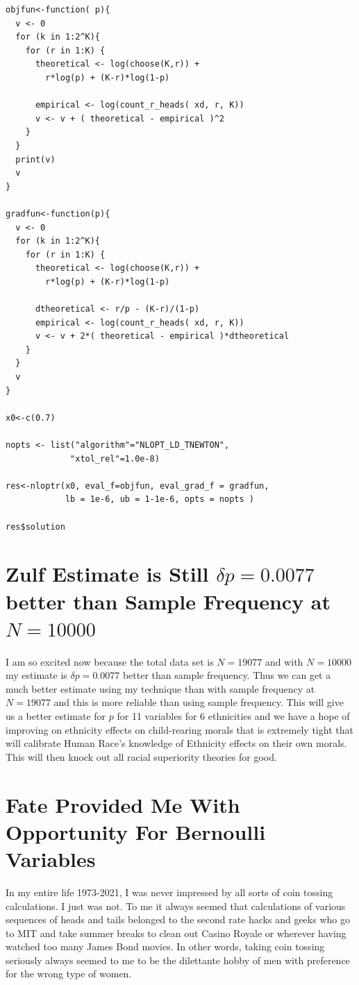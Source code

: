 \documentclass{amsart}
\begin{document}
\begin{verbatim}
objfun<-function( p){
  v <- 0
  for (k in 1:2^K){
    for (r in 1:K) {
      theoretical <- log(choose(K,r)) + 
        r*log(p) + (K-r)*log(1-p)
      
      empirical <- log(count_r_heads( xd, r, K))
      v <- v + ( theoretical - empirical )^2
    }
  }
  print(v)
  v
}

gradfun<-function(p){
  v <- 0
  for (k in 1:2^K){
    for (r in 1:K) {
      theoretical <- log(choose(K,r)) + 
        r*log(p) + (K-r)*log(1-p)
      
      dtheoretical <- r/p - (K-r)/(1-p)
      empirical <- log(count_r_heads( xd, r, K))
      v <- v + 2*( theoretical - empirical )*dtheoretical
    }
  }
  v
}

x0<-c(0.7)

nopts <- list("algorithm"="NLOPT_LD_TNEWTON",
             "xtol_rel"=1.0e-8)

res<-nloptr(x0, eval_f=objfun, eval_grad_f = gradfun, 
            lb = 1e-6, ub = 1-1e-6, opts = nopts )

res$solution
\end{verbatim}


\section{Zulf Estimate is Still $\delta p = 0.0077$ better than Sample Frequency at $N=10000$}

I am so excited now because the total data set is $N=19077$ and with $N=10000$ my estimate is $\delta p=0.0077$ better than sample frequency.  Thus we can get a much better estimate using my technique than with sample frequency at $N=19077$ and this is more reliable than using sample frequency.  This will give us a better estimate for $p$ for 11 variables for 6 ethnicities and we have a hope of improving on ethnicity effects on child-rearing morals that is extremely tight that will calibrate Human Race's knowledge of Ethnicity effects on their own morals.  This will then knock out all racial superiority theories for good.

\section{Fate Provided Me With Opportunity For Bernoulli Variables}

In my entire life 1973-2021, I was never impressed by all sorts of coin tossing calculations.  I just was not.  To me it always seemed that calculations of various sequences of heads and tails belonged to the second rate hacks and geeks who go to MIT and take summer breaks to clean out Casino Royale or wherever having watched too many James Bond movies.  In other words, taking coin tossing seriously always seemed to me to be the dilettante hobby of men with preference for the wrong type of women.
\end{document}
